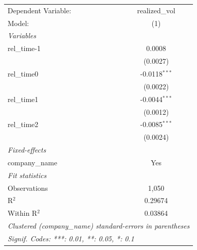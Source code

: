 
\begingroup
\centering
\begin{tabular}{lc}
   \tabularnewline \midrule \midrule
   Dependent Variable: & realized\_vol\\   
   Model:              & (1)\\  
   \midrule
   \emph{Variables}\\
   rel\_time-1         & 0.0008\\   
                       & (0.0027)\\   
   rel\_time0          & -0.0118$^{***}$\\   
                       & (0.0022)\\   
   rel\_time1          & -0.0044$^{***}$\\   
                       & (0.0012)\\   
   rel\_time2          & -0.0085$^{***}$\\   
                       & (0.0024)\\   
   \midrule
   \emph{Fixed-effects}\\
   company\_name       & Yes\\  
   \midrule
   \emph{Fit statistics}\\
   Observations        & 1,050\\  
   R$^2$               & 0.29674\\  
   Within R$^2$        & 0.03864\\  
   \midrule \midrule
   \multicolumn{2}{l}{\emph{Clustered (company\_name) standard-errors in parentheses}}\\
   \multicolumn{2}{l}{\emph{Signif. Codes: ***: 0.01, **: 0.05, *: 0.1}}\\
\end{tabular}
\par\endgroup


